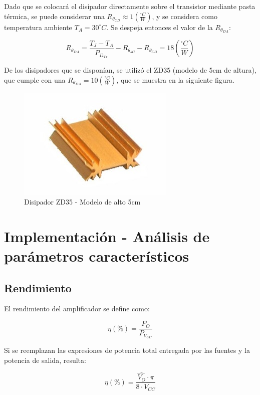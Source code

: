 Dado que se colocará el disipador directamente sobre el transistor mediante pasta térmica, se puede considerar una $R_{\theta_{CD}} \approx 1 \left(\frac{^{\circ}C}{W}\right)$, y se considera como temperatura ambiente $T_A = 30^{\circ}C$. Se despeja entonces el valor de la $R_{\theta_{DA}}$:

\[
R_{\theta_{DA}} = \frac{T_J - T_A}{P_{D_{Tx}}} - R_{\theta_{JC}} - R_{\theta_{CD}} = 18 \left(\frac{^{\circ}C}{W}\right)
\]

De los disipadores que se disponían, se utilizó el ZD35 (modelo de 5cm de altura), que cumple con una $R_{\theta_{DA}} = 10 \left(\frac{^{\circ}C}{W}\right)$, que se muestra en la siguiente figura.

\begin{figure}[!ht]
\begin{centering}
\includegraphics[scale=0.5]{Imagenes/ZD35.jpg}
\par\end{centering}
\caption{Disipador ZD35 - Modelo de alto 5cm}
\end{figure}

\newpage

\section{Implementación - Análisis de parámetros característicos}

\subsection{Rendimiento}

El rendimiento del amplificador se define como: 

\[
\eta(\%) = \frac{P_O}{P_{V_{CC}}}
\]

Si se reemplazan las expresiones de potencia total entregada por las fuentes y la potencia de salida, resulta:

\[
\eta(\%) = \frac{\hat{V_O} \cdot \pi}{8 \cdot V_{CC}} 
\]

